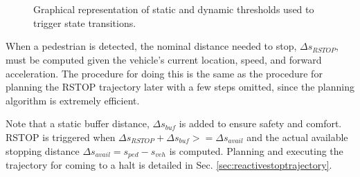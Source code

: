 \documentclass[letterpaper, 10 pt, conference]{ieeeconf}  %
\begin{document}
\begin{figure}[thpb]
\centering
  \\
  \\
  \caption{Graphical representation of static and dynamic thresholds used to trigger state transitions.}
  \label{fig:react}
\end{figure}

When a pedestrian is detected, the nominal distance needed to stop, $\Delta s_{RSTOP}$, must be computed given the vehicle's current location, speed, and forward acceleration.
The procedure for doing this is the same as the procedure for planning the RSTOP trajectory later with a few steps omitted, since the planning algorithm is extremely efficient.

Note that a static buffer distance, $\Delta s_{buf}$ is added to ensure safety and comfort.
RSTOP is triggered when $\Delta s_{RSTOP} + \Delta s_{buf} >= \Delta s_{avail}$ and the actual available stopping distance $\Delta s_{avail} = s_{ped} - s_{veh}$ is computed.
Planning and executing the trajectory for coming to a halt is detailed in Sec. \ref{sec:reactivestoptrajectory}.
\end{document}
